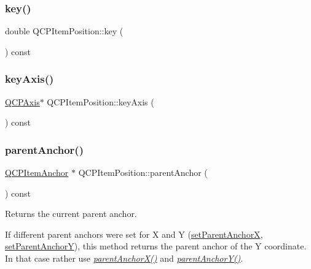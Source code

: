 \subsubsection{\texorpdfstring{key()}{key()}}
{\footnotesize\ttfamily double Q\+C\+P\+Item\+Position\+::key (\begin{DoxyParamCaption}{ }\end{DoxyParamCaption}) const\hspace{0.3cm}{\ttfamily [inline]}}

\mbox{\label{class_q_c_p_item_position_a9ad34861fbfd8be8b8270c16f879169c}} 
\subsubsection{\texorpdfstring{key\+Axis()}{keyAxis()}}
{\footnotesize\ttfamily \hyperlink{class_q_c_p_axis}{Q\+C\+P\+Axis}$\ast$ Q\+C\+P\+Item\+Position\+::key\+Axis (\begin{DoxyParamCaption}{ }\end{DoxyParamCaption}) const\hspace{0.3cm}{\ttfamily [inline]}}

\mbox{\label{class_q_c_p_item_position_a0a87f9dce1af6cc9b510785991bcf1c6}} 
\subsubsection{\texorpdfstring{parent\+Anchor()}{parentAnchor()}}
{\footnotesize\ttfamily \hyperlink{class_q_c_p_item_anchor}{Q\+C\+P\+Item\+Anchor} $\ast$ Q\+C\+P\+Item\+Position\+::parent\+Anchor (\begin{DoxyParamCaption}{ }\end{DoxyParamCaption}) const\hspace{0.3cm}{\ttfamily [inline]}}

Returns the current parent anchor.

If different parent anchors were set for X and Y (\hyperlink{class_q_c_p_item_position_add71461a973927c74e42179480916d9c}{set\+Parent\+AnchorX}, \hyperlink{class_q_c_p_item_position_add5ec1db9d19cec58a3b5c9e0a0c3f9d}{set\+Parent\+AnchorY}), this method returns the parent anchor of the Y coordinate. In that case rather use {\itshape \hyperlink{class_q_c_p_item_position_a605cb8b2cf6044d3d03cb1a894faf98a}{parent\+Anchor\+X()}} and {\itshape \hyperlink{class_q_c_p_item_position_aa40afec791a4339b09572922ca425ec2}{parent\+Anchor\+Y()}}.

